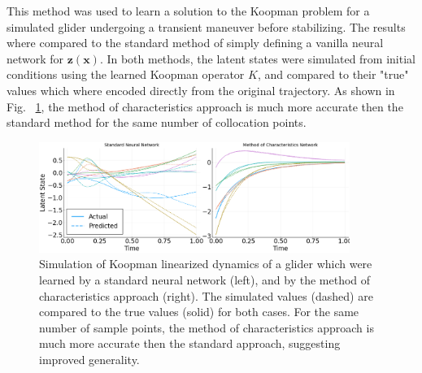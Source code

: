 \documentclass[12pt, letterpaper]{article}
\begin{document}
This method was used to learn a solution to the Koopman problem for a simulated glider undergoing a transient maneuver before stabilizing.  The results where compared to the standard method of simply defining a vanilla neural network for $\mathbf{z}(\mathbf{x})$.  In both methods, the latent states were simulated from initial conditions using the learned Koopman operator $K$, and compared to their "true" values which where encoded directly from the original trajectory.  As shown in Fig. ~\ref{fig:method_of_characteristics}, the method of characteristics approach is much more accurate then the standard method for the same number of collocation points.  

\begin{figure}[hbt!]
\centering
\includegraphics[width=0.9\textwidth]{figures/method_of_characteristics.png}
    \caption{Simulation of Koopman linearized dynamics of a glider which were learned by a standard neural network (left), and by the method of characteristics approach (right).  The simulated values (dashed) are compared to the true values (solid) for both cases.  For the same number of sample points, the method of characteristics approach is much more accurate then the standard approach, suggesting improved generality.}
\label{fig:method_of_characteristics}
\end{figure}
\end{document}
